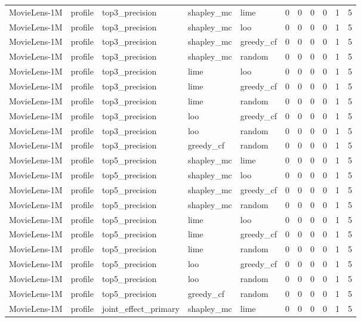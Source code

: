 \begin{table}[t]
{\begin{tabular}{lllllrrrrrr}
MovieLens-1M & profile & top3\_precision & shapley\_mc & lime & 0 & 0 & 0 & 0 & 1 & 5 \\
MovieLens-1M & profile & top3\_precision & shapley\_mc & loo & 0 & 0 & 0 & 0 & 1 & 5 \\
MovieLens-1M & profile & top3\_precision & shapley\_mc & greedy\_cf & 0 & 0 & 0 & 0 & 1 & 5 \\
MovieLens-1M & profile & top3\_precision & shapley\_mc & random & 0 & 0 & 0 & 0 & 1 & 5 \\
MovieLens-1M & profile & top3\_precision & lime & loo & 0 & 0 & 0 & 0 & 1 & 5 \\
MovieLens-1M & profile & top3\_precision & lime & greedy\_cf & 0 & 0 & 0 & 0 & 1 & 5 \\
MovieLens-1M & profile & top3\_precision & lime & random & 0 & 0 & 0 & 0 & 1 & 5 \\
MovieLens-1M & profile & top3\_precision & loo & greedy\_cf & 0 & 0 & 0 & 0 & 1 & 5 \\
MovieLens-1M & profile & top3\_precision & loo & random & 0 & 0 & 0 & 0 & 1 & 5 \\
MovieLens-1M & profile & top3\_precision & greedy\_cf & random & 0 & 0 & 0 & 0 & 1 & 5 \\
MovieLens-1M & profile & top5\_precision & shapley\_mc & lime & 0 & 0 & 0 & 0 & 1 & 5 \\
MovieLens-1M & profile & top5\_precision & shapley\_mc & loo & 0 & 0 & 0 & 0 & 1 & 5 \\
MovieLens-1M & profile & top5\_precision & shapley\_mc & greedy\_cf & 0 & 0 & 0 & 0 & 1 & 5 \\
MovieLens-1M & profile & top5\_precision & shapley\_mc & random & 0 & 0 & 0 & 0 & 1 & 5 \\
MovieLens-1M & profile & top5\_precision & lime & loo & 0 & 0 & 0 & 0 & 1 & 5 \\
MovieLens-1M & profile & top5\_precision & lime & greedy\_cf & 0 & 0 & 0 & 0 & 1 & 5 \\
MovieLens-1M & profile & top5\_precision & lime & random & 0 & 0 & 0 & 0 & 1 & 5 \\
MovieLens-1M & profile & top5\_precision & loo & greedy\_cf & 0 & 0 & 0 & 0 & 1 & 5 \\
MovieLens-1M & profile & top5\_precision & loo & random & 0 & 0 & 0 & 0 & 1 & 5 \\
MovieLens-1M & profile & top5\_precision & greedy\_cf & random & 0 & 0 & 0 & 0 & 1 & 5 \\
MovieLens-1M & profile & joint\_effect\_primary & shapley\_mc & lime & 0 & 0 & 0 & 0 & 1 & 5 \\

\end{tabular}}
\end{table}
